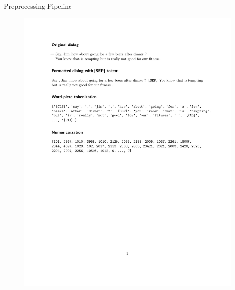 \documentclass[11pt,aspectratio=169]{beamer}
\begin{document}
    \begin{frame}{Preprocessing Pipeline}
        \begin{figure}
        \centering
        \includegraphics[scale=0.56]{figures/bert-output-simple.pdf}
        \label{fig:preproc_context_example4}
    \end{figure}
    \end{frame}
    
\end{document}
